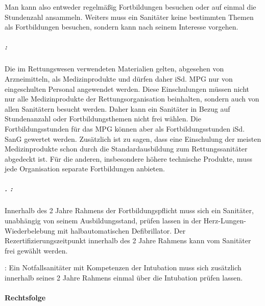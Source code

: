 Man kann also entweder regelmä{\ss}ig Fortbildungen besuchen oder auf
einmal die Stundenzahl ansammeln. Weiters muss ein Sanitäter keine
bestimmten Themen als Fortbildungen besuchen, sondern kann nach seinem
Interesse vorgehen.

\subparagraph*{ 
:}

Die im Rettungswesen verwendeten Materialien gelten, abgesehen von
Arzneimitteln, als Medizinprodukte und d\"urfen daher iSd. MPG nur von
eingeschulten Personal angewendet werden. Diese Einschulungen m\"ussen
nicht nur alle Medizinprodukte der Rettungsorganisation beinhalten,
sondern auch von allen Sanitätern besucht werden. Daher kann ein
Sanitäter in Bezug auf Stundenanzahl oder Fortbildungsthemen nicht
frei wählen. Die Fortbildungsstunden f\"ur das MPG k\"onnen aber als
Fortbildungsstunden iSd. SanG gewertet werden. Zusätzlich ist zu
sagen, dass eine Einschulung der meisten Medizinprodukte schon durch
die Standardausbildung zum Rettungs\-sani\-täter abgedeckt ist. F\"ur
die anderen, insbesondere h\"ohere technische Produkte, muss jede
Org\-anisation separate Fortbildungen anbieten.

\subparagraph*{ . :}

Innerhalb des 2 Jahre Rahmens der Fortbildungspflicht muss sich ein
Sanitäter, unabhängig von seinem Ausbildungsstand, pr\"ufen lassen
in der Herz-Lungen-Wiederbelebung mit halbautomatischen Defibrillator.
Der Rezertifizierungszeitpunkt innerhalb des 2 Jahre Rahmens kann vom
Sanitäter frei gewählt werden.

: Ein Notfallsanitäter mit
Kompetenzen der Intubation muss sich zusätzlich innerhalb seines 2
Jahre Rahmens einmal \"uber die Intubation pr\"ufen lassen.

\paragraph*{Rechtsfolge}

